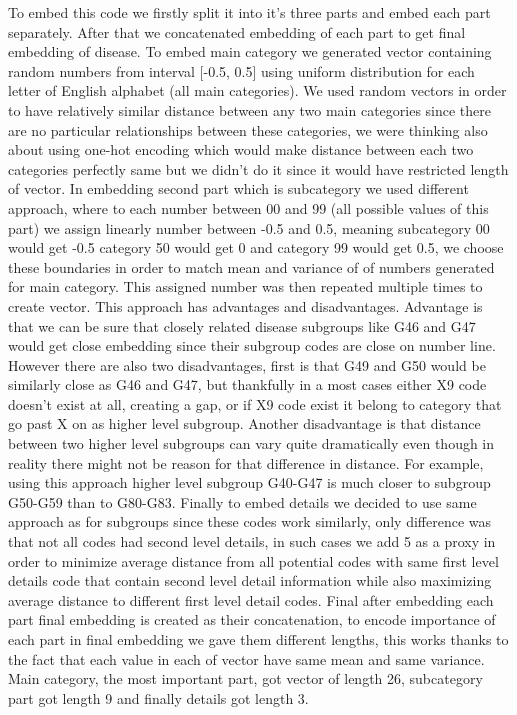 To embed this code we firstly split it into it's three parts and embed each part separately. After that we concatenated embedding of each part to get final embedding of disease.
To embed main category we generated vector containing random numbers from interval [-0.5, 0.5] using uniform distribution for each letter of English alphabet (all main categories). We used random vectors in order to have relatively similar distance between any two main categories since there are no particular relationships between these categories, we were thinking also about using one-hot encoding which would make distance between each two categories perfectly same but we didn't do it since it would have restricted length of vector. 
In embedding second part which is subcategory we used different approach, where to each number between 00 and 99 (all possible values of this part) we assign linearly number between -0.5 and 0.5, meaning subcategory 00 would get -0.5 category 50 would get 0 and category 99 would get 0.5, we choose these boundaries in order to match mean and variance of of numbers generated for main category. This assigned number was then repeated multiple times to create vector. This approach has advantages and disadvantages. Advantage is that we can be sure that closely related disease subgroups like G46 and G47 would get close embedding since their subgroup codes are close on number line. However there are also two disadvantages, first is that G49 and G50 would be similarly close as G46 and G47, but thankfully in a most cases either X9 code doesn't exist at all, creating a gap, or if X9 code exist it belong to category that go past X on as higher level subgroup. Another disadvantage is that distance between two higher level subgroups can vary quite dramatically even though in reality there might not be reason for that difference in distance. For example, using this approach higher level subgroup G40-G47 is much closer to subgroup G50-G59 than to G80-G83.
Finally to embed details we decided to use same approach as for subgroups since these codes work similarly, only difference was that not all codes had second level details, in such cases we add 5 as a proxy in order to minimize average distance from all potential codes with same first level details code that contain second level detail information while also maximizing average distance to different first level detail codes.
Final after embedding each part final embedding is created as their concatenation, to encode importance of each part in final embedding we gave them different lengths, this works thanks to the fact that each value in each of vector have same mean and same variance. Main category, the most important part, got vector of length 26, subcategory part got length 9 and finally details got length 3.
